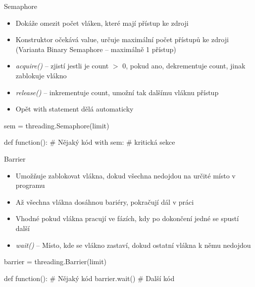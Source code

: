 \documentclass{beamer}
\begin{document}
\begin{frame}[fragile]{Semaphore}
    \begin{itemize}
        \item Dokáže omezit počet vláken, které mají přístup ke zdroji
        \item Konstruktor očekává value, určuje maximální počet přístupů ke zdroji
        \newline (Varianta Binary Semaphore – maximálně 1 přístup)

        \vskip 0.25in
        \item \textit{acquire()} – zjistí jestli je count $>$ 0, pokud ano, dekrementuje count, jinak zablokuje vlákno
        \item \textit{release()} – inkrementuje count, umožní tak dalšímu vláknu přístup
        \item Opět with statement dělá automaticky
    \end{itemize}
    \scriptsize
    \begin{semiverbatim}
    sem = threading.Semaphore(limit)

    def function():
        # Nějaký kód
        with sem:
            # kritická sekce
    \end{semiverbatim}
\end{frame}

\begin{frame}[fragile]{Barrier}
    \begin{itemize}
        \item Umožňuje zablokovat vlákna, dokud všechna nedojdou na určité místo v programu
        \item Až všechna vlákna dosáhnou bariéry, pokračují dál v práci
        \item Vhodné pokud vlákna pracují ve fázích, kdy po dokončení jedné se spustí další

        \vskip 0.25in
        \item \textit{wait()} – Místo, kde se vlákno zastaví, dokud ostatní vlákna k němu nedojdou
    \end{itemize}
    \scriptsize
    \begin{semiverbatim}
    barrier = threading.Barrier(limit)

    def function():
        # Nějaký kód
        barrier.wait()
        # Další kód
    \end{semiverbatim}
\end{frame}
\end{document}
